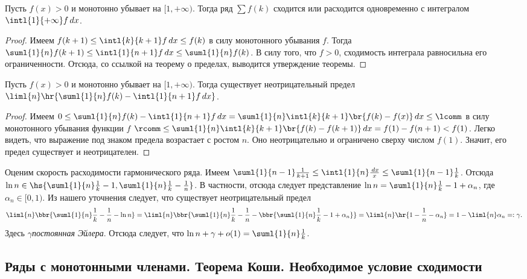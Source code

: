 \documentclass[a4paper]{article}
\begin{document}
\begin{theorem}
Пусть $f(x)>0$ и монотонно убывает на $[1, +\infty)$. Тогда ряд $\sum f(k)$ сходится или расходится
одновременно с интегралом $\intl{1}{+\infty} f\,d x$.
\end{theorem}
\begin{proof}
Имеем $f(k+1) \le \intl{k}{k+1}f\,d x \le f(k)$ в силу монотонного убывания $f$. Тогда
$\suml{1}{n} f(k+1) \le \intl{1}{n+1}f\,d x \le \suml{1}{n}f(k)$. В силу того, что $f > 0$,
сходимость интеграла равносильна его ограниченности. Отсюда, со ссылкой на теорему о пределах,
выводится утверждение теоремы.
\end{proof}

\begin{theorem}
Пусть $f(x)>0$ и монотонно убывает на $[1, +\infty)$. Тогда существует неотрицательный предел
$\liml{n} \hr{ \suml{1}{n}f(k) - \intl{1}{n+1}f\,d x}$.
\end{theorem}
\begin{proof}
Имеем $0 \le \suml{1}{n}f(k) - \intl{1}{n+1}f\,d x=\suml{1}{n}\intl{k}{k+1}\br{f(k)-f(x)}\,d x
\le \lcomm$ в силу монотонного убывания функции $f$ $\rcomm \le
\suml{1}{n}\intl{k}{k+1}\br{f(k)-f(k+1)}\,d x=f(1)-f(n+1) < f(1)$. Легко видеть, что выражение под
знаком предела возрастает с ростом $n$. Оно неотрицательно и ограничено сверху числом $f(1)$.
Значит, его предел существует и неотрицателен.
\end{proof}

\begin{ex}
Оценим скорость расходимости гармонического ряда. Имеем $\suml{1}{n-1}\frac{1}{k+1} \le
\intl{1}{n}\frac{\,d x}{x} \le \suml{1}{n-1} \frac{1}{k}$. Отсюда $\ln n \in
\hs{\suml{1}{n}\frac{1}{k}- 1, \suml{1}{n}\frac{1}{k} - \frac{1}{n}}$. В частности, отсюда следует
представление $\ln n = \suml{1}{n}\frac{1}{k} - 1 + \alpha_n$, где $\alpha_n \in [0,1)$. Из нашего
уточнения следует, что существует неотрицательный предел
$$\liml{n}\bbr{ \suml{1}{n}\frac{1}{k} -
\frac{1}{n} - \ln n} = \liml{n}\bbr{ \suml{1}{n}\frac{1}{k} - \frac{1}{n} - \bbr{
\suml{1}{n}\frac{1}{k} - 1 + \alpha_n}} = \liml{n}\hr{ 1 - \frac{1}{n} - \alpha_n} =
1-\liml{n}\alpha_n =: \gamma.$$ Здесь $\gamma$\т \emph{постоянная Эйлера}. Отсюда следует, что
$\ln n + \gamma + o(1) = \suml{1}{n}\frac{1}{k}$.
\end{ex}

\subsection{Ряды с монотонными членами. Теорема Коши. Необходимое условие сходимости}
\end{document}
